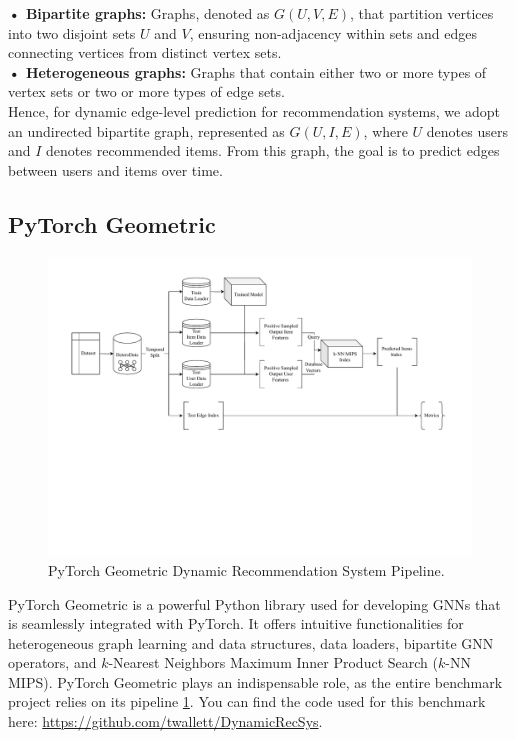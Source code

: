 \documentclass[bst/sn-nature]{sn-jnl}
\begin{document}
\begin{multicols}{2}
\textbf{• Bipartite graphs:} Graphs, denoted as $G(U, V, E)$, that partition vertices into two disjoint sets $U$ and $V$, ensuring non-adjacency within sets and edges connecting vertices from distinct vertex sets. \\

\textbf{• Heterogeneous graphs:} Graphs that contain either two or more types of vertex sets or two or more types of edge sets. \\ 

Hence, for dynamic edge-level prediction for recommendation systems, we adopt an undirected bipartite graph, represented as $G(U, I, E)$, where $U$ denotes users and $I$ denotes recommended items. From this graph, the goal is to predict edges between users and items over time.

\subsection{PyTorch Geometric}

\begin{figure}
    \centering
    \includegraphics[width=\linewidth]{imgs/PyTorchPipeline.drawio.pdf}
    \caption{PyTorch Geometric Dynamic Recommendation System Pipeline.}
    \label{fig:pytorch_geometric_pipeline}
\end{figure}

\quad PyTorch Geometric is a powerful Python library used for developing GNNs that is seamlessly integrated with PyTorch. It offers intuitive functionalities for heterogeneous graph learning and data structures, data loaders, bipartite GNN operators, and $k$-Nearest Neighbors Maximum Inner Product Search ($k$-NN MIPS). PyTorch Geometric plays an indispensable role, as the entire benchmark project relies on its pipeline \ref{fig:pytorch_geometric_pipeline}. You can find the code used for this benchmark here: \href{https://github.com/twallett/DynamicRecSys}{https://github.com/twallett/DynamicRecSys}. 


\end{multicols}
\end{document}
